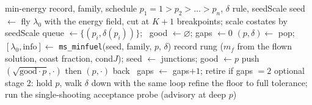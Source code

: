 \documentclass[11pt]{article}
\begin{document}
\begin{algorithm}[h]
\caption{\texttt{run\_minfuel\_race}: one continuation arm}
\begin{algorithmic}[1]
\Require min-energy record, family, schedule $p_1{=}1>p_2>\dots>p_n$, $\delta$ rule, seedScale
\State seed $\gets$ fly $\lambda_0$ with the energy field, cut at $K{+}1$ breakpoints; scale costates by seedScale
\State queue $\gets\{(p_i,\delta(p_i))\}$; \ good $\gets\varnothing$; gaps $\gets0$
  \State $(p,\delta)\gets$ pop; $[\lambda_0,\mathrm{info}]\gets$ \texttt{ms\_minfuel}(seed, family, $p$, $\delta$) 
     \State record rung ($m_f$ from the flown solution, coast fraction, cond$J$); seed $\gets$ junctions; good $\gets p$
   push $(\sqrt{\text{good}\cdot p},\cdot)$ then $(p,\cdot)$ back
  \Else\ gaps $\gets$ gaps$+1$; retire if gaps $=2$
  \EndIf
\EndWhile
\State optional stage 2: hold $p$, walk $\delta$ down with the same loop
\State refine the floor to full tolerance; run the single-shooting acceptance probe (advisory at deep $p$)
\end{algorithmic}
\end{algorithm}
\end{document}
